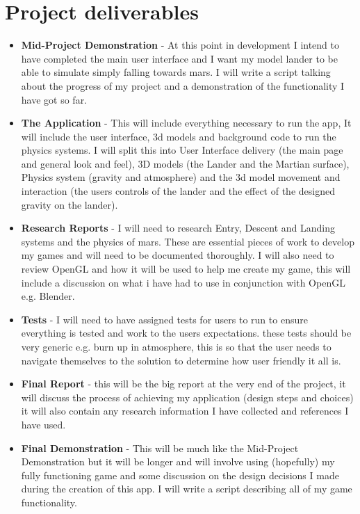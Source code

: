 \documentclass[11pt,fleqn,twoside]{article}
\begin{document}
\section{Project deliverables}
 \begin{itemize}
	\item \textbf{Mid-Project Demonstration} - At this point in development I intend to have completed the main user interface and I want my model lander to be able to simulate simply falling towards mars. I will write a script talking about the progress of my project and a demonstration of the functionality I have got so far.
	\item \textbf{The Application} - This will include everything necessary to run the app, It will include the user interface, 3d models and background code to run the physics systems. I will split this into User Interface delivery (the main page and general look and feel), 3D models (the Lander and the Martian surface), Physics system (gravity and atmosphere) and the 3d model movement and interaction (the users controls of the lander and the effect of the designed gravity on the lander).
	\item \textbf{Research Reports} - I will need to research Entry, Descent and Landing systems and the physics of mars. These are essential pieces of work to develop my games and will need to be documented thoroughly. I will also need to review OpenGL and how it will be used to help me create my game, this will include a discussion on what i have had to use in conjunction with OpenGL e.g. Blender. 
	\item \textbf{Tests} - I will need to have assigned tests for users to run to ensure everything is tested and work to the users expectations. these tests should be very generic e.g. burn up in atmosphere, this is so that the user needs to navigate themselves to the solution to determine how user friendly it all is.
	\item \textbf{Final Report} - this will be the big report at the very end of the project, it will discuss the process of achieving my application (design steps and choices) it will also contain any research information I have collected and references I have used.
	\item \textbf{Final Demonstration} - This will be much like the Mid-Project Demonstration but it will be longer and will involve using (hopefully) my fully functioning game and some discussion on the design decisions I made during the creation of this app. I will write a script describing all of my game functionality.

\end{itemize}
	
\end{document}
